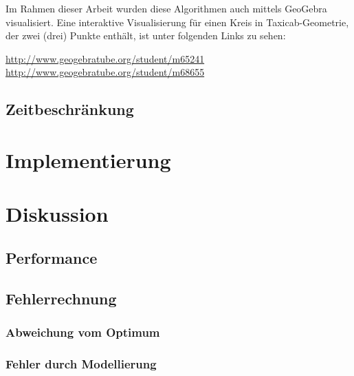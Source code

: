 \documentclass{article}
\begin{document}
Im Rahmen dieser Arbeit wurden diese Algorithmen auch mittels GeoGebra visualisiert. Eine interaktive Visualisierung
für einen Kreis in Taxicab-Geometrie, der zwei (drei) Punkte enthält, ist unter folgenden Links zu sehen: 

\url{http://www.geogebratube.org/student/m65241} \newline
\url{http://www.geogebratube.org/student/m68655}



\subsection{Zeitbeschränkung}

\clearpage
\section{Implementierung}


\clearpage
\section{Diskussion}

\subsection{Performance}

\subsection{Fehlerrechnung}

\subsubsection{Abweichung vom Optimum}

\subsubsection{Fehler durch Modellierung}
\end{document}

